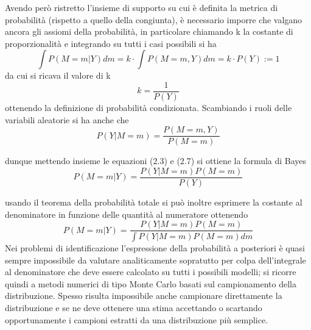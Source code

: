 \documentclass[10pt,a4paper,oneside,openany,noindent]{report}
\begin{document}
Avendo però ristretto l’insieme di supporto su cui è definita la metrica di probabilità (rispetto a quello della congiunta),
è necessario imporre che valgano ancora gli assiomi della probabilità, in particolare
chiamando k la costante di proporzionalità e integrando su tutti i casi possibili si ha
\begin{equation}\int P (M = m|Y )dm =
k \cdot \int P (M = m, Y )dm = k \cdot P (Y ) := 1\end{equation}
da cui si ricava il valore di k
\begin{equation}
k =\frac{1}{P(Y)}
\end{equation}
ottenendo la definizione di probabilità condizionata.
Scambiando i ruoli delle variabili aleatorie si ha anche che
\begin{equation}
P (Y |M = m) =\frac{
P (M = m, Y )}{
P (M = m)}
\end{equation}


dunque mettendo insieme le equazioni (2.3) e (2.7) si ottiene la formula di Bayes
\begin{equation}
P (M = m|Y ) =\frac{
P (Y |M = m)P (M = m)}{
P (Y )}
\end{equation}

usando il teorema della probabilità totale si può inoltre esprimere la costante al
denominatore in funzione delle quantità al numeratore ottenendo
\begin{equation}
P (M = m|Y ) =\frac{
P (Y |M = m)P (M = m)}{\int
P (Y |M = m)P (M = m)dm}
\end{equation}
Nei problemi di identificazione l’espressione della probabilità a posteriori è quasi
sempre impossibile da valutare analiticamente sopratutto per colpa dell’integrale al
denominatore che deve essere calcolato su tutti i possibili modelli; si ricorre quindi a
metodi numerici di tipo Monte Carlo basati sul campionamento della distribuzione.
Spesso risulta impossibile anche campionare direttamente la distribuzione e se ne
deve ottenere una stima accettando o scartando opportunamente i campioni estratti
da una distribuzione più semplice.
\end{document}
